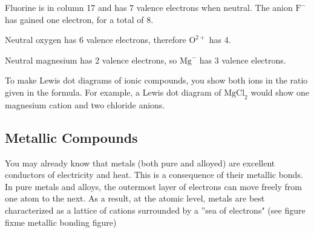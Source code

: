 Fluorine is in column 17 and has 7 valence electrons when neutral. The anion 
$\text{F}^-$ has gained one electron, for a total of 8. 

\begin{center}
\end{center}

Neutral oxygen has 6 valence electrons, therefore $\text{O}^{2+}$ has 4. 
\begin{center}
\end{center}

Neutral magnesium has 2 valence electrons, so $\text{Mg}^{-}$ has 3 valence 
electrons. 
\begin{center}
\end{center}

To make Lewis dot diagrams of ionic compounds, you show both ions in the ratio 
given in the formula. For example, a Lewis dot diagram of $\text{MgCl}_2$ would 
show one magnesium cation and two chloride anions. 

\subsection{Metallic Compounds}
You may already know that metals (both pure and alloyed) are excellent conductors 
of electricity and heat. This is a consequence of their metallic bonds. In pure 
metals and alloys, the outermost layer of electrons can move freely from one atom 
to the next. As a result, at the atomic level, metals are best characterized as a 
lattice of cations surrounded by a ''sea of electrons" (see figure	fixme metallic bonding figure)

